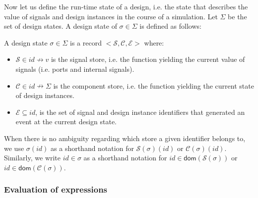 Now let us define the run-time state of a design, i.e. the state that
describes the value of signals and design instances in the course of a
simulation. Let $\Sigma$ be the set of design states.  A design state
of $\sigma\in{}\Sigma$ is defined as follows:

\begin{definition}
  \label{def:design-state}
  A design state $\sigma\in\Sigma$ is a record
  ${<}\mathcal{S},\mathcal{C},\mathcal{E}{>}$ where:
  \begin{itemize}[label=$-$]
  \item $\mathcal{S}\in{}id\nrightarrow{}v$ is the signal store,
    i.e. the function yielding the current value of signals
    (i.e. ports and internal signals).
  \item $\mathcal{C}\in{}id\nrightarrow{}\Sigma$ is the component
    store, i.e.  the function yielding the current state of design
    instances.
  \item $\mathcal{E}\subseteq{}id$, is the set of signal and design
    instance identifiers that generated an event at the current design
    state.
  \end{itemize}
\end{definition}

When there is no ambiguity regarding which store a given identifier
belongs to, we use $\sigma(id)$ as a shorthand notation for
$\mathcal{S}(\sigma)(id)$ or $\mathcal{C}(\sigma)(id)$.  Similarly, we
write $id\in\sigma$ as a shorthand notation for
$id\in\mathsf{dom}(\mathcal{S}(\sigma))$ or
$id\in\mathsf{dom}(\mathcal{C}(\sigma))$.

\subsubsection{Evaluation of expressions}
\label{subsubsec:expr-eval}

